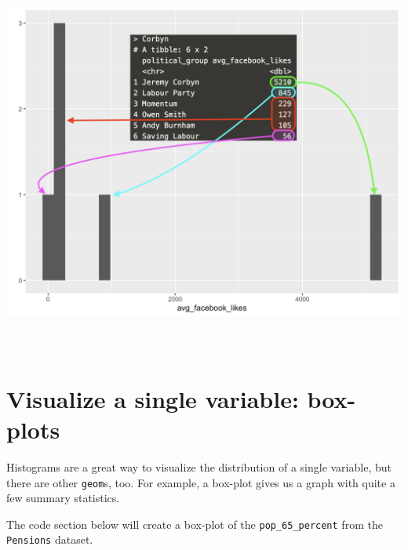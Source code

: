 \documentclass[letterpaper,12pt,twoside,]{pinp}
\begin{document}
\begin{center}\includegraphics[width=7in,height=5in]{../img/corbyn-histogram} \end{center}

\hypertarget{visualize-a-single-variable-box-plots}{%
\section{Visualize a single variable:
box-plots}\label{visualize-a-single-variable-box-plots}}

Histograms are a great way to visualize the distribution of a single
variable, but there are other \texttt{geom}s, too. For example, a
box-plot gives us a graph with quite a few summary statistics.

The code section below will create a box-plot of the
\texttt{pop\_65\_percent} from the \texttt{Pensions} dataset.

\begin{Shaded}
\begin{Highlighting}[]
\SpecialCharTok{\%\textgreater{}\%} 
\SpecialCharTok{::}\NormalTok{(}
                  \NormalTok{,}
                  \NormalTok{)}
\end{Highlighting}
\end{Shaded}
\end{document}
